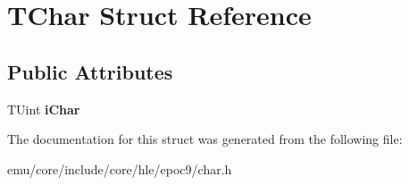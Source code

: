 \hypertarget{struct_t_char}{}\section{T\+Char Struct Reference}
\label{struct_t_char}
\subsection*{Public Attributes}
\begin{DoxyCompactItemize}
\item 
\mbox{\label{struct_t_char_a37d77bb192fb9c85298b2b39f9a0c4e3}} 
T\+Uint {\bfseries i\+Char}
\end{DoxyCompactItemize}


The documentation for this struct was generated from the following file\+:\begin{DoxyCompactItemize}
\item 
emu/core/include/core/hle/epoc9/char.\+h\end{DoxyCompactItemize}
